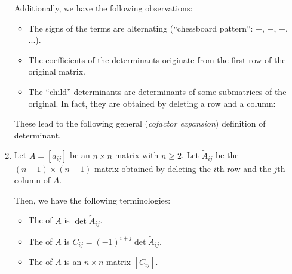 \begin{enumerate}
Additionally, we have the following observations:
\begin{itemize}
\item The signs of the terms are alternating (``chessboard pattern'': \(+\),
\(-\), \(+\), ...).
\item The coefficients of the determinants originate from the first row of the
original matrix.
\item The ``child'' determinants are determinants of some submatrices of the
original. In fact, they are obtained by deleting a row and a column:
\begin{center}
\quad
{}
\quad
{}
\end{center}
\end{itemize}
These lead to the following general (\emph{cofactor expansion}) definition of
determinant.

\item Let \(A=[a_{ij}]\) be an \(n\times n\) matrix with \(n\ge 2\). Let
\(\widetilde{A}_{ij}\) be the \((n-1)\times (n-1)\) matrix obtained by deleting
the \(i\)th row and the \(j\)th column of \(A\).

Then, we have the following terminologies:
\begin{itemize}
\item The  of \(A\) is \(\det \widetilde{A}_{ij}\).
\item The  of \(A\) is \(C_{ij}=(-1)^{i+j}\det \widetilde{A}_{ij}\).
\item The  of \(A\) is an \(n\times n\) matrix \([C_{ij}]\).
\end{itemize}


\end{enumerate}
